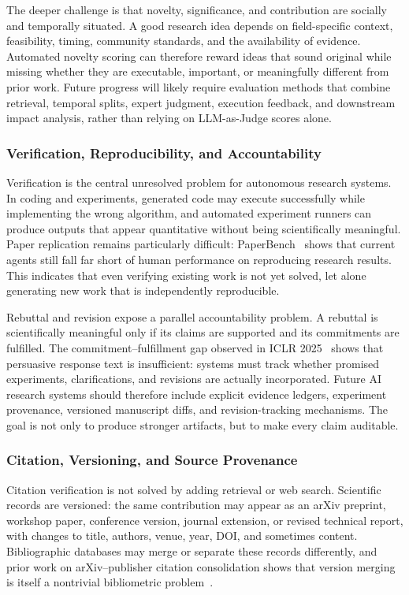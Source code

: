 The deeper challenge is that novelty, significance, and contribution are socially and temporally situated. A good research idea depends on field-specific context, feasibility, timing, community standards, and the availability of evidence. Automated novelty scoring can therefore reward ideas that sound original while missing whether they are executable, important, or meaningfully different from prior work. Future progress will likely require evaluation methods that combine retrieval, temporal splits, expert judgment, execution feedback, and downstream impact analysis, rather than relying on LLM-as-Judge scores alone.


\subsubsection{Verification, Reproducibility, and Accountability}

Verification is the central unresolved problem for autonomous research systems. In coding and experiments, generated code may execute successfully while implementing the wrong algorithm, and automated experiment runners can produce outputs that appear quantitative without being scientifically meaningful. Paper replication remains particularly difficult: PaperBench~\cite{paperbench2025} shows that current agents still fall far short of human performance on reproducing research results. This indicates that even verifying existing work is not yet solved, let alone generating new work that is independently reproducible.

Rebuttal and revision expose a parallel accountability problem. A rebuttal is scientifically meaningful only if its claims are supported and its commitments are fulfilled. The commitment--fulfillment gap observed in ICLR 2025~\cite{rebuttalcommitment2026} shows that persuasive response text is insufficient: systems must track whether promised experiments, clarifications, and revisions are actually incorporated. Future AI research systems should therefore include explicit evidence ledgers, experiment provenance, versioned manuscript diffs, and revision-tracking mechanisms. The goal is not only to produce stronger artifacts, but to make every claim auditable.


\subsubsection{Citation, Versioning, and Source Provenance}

Citation verification is not solved by adding retrieval or web search. Scientific records are versioned: the same contribution may appear as an arXiv preprint, workshop paper, conference version, journal extension, or revised technical report, with changes to title, authors, venue, year, DOI, and sometimes content. Bibliographic databases may merge or separate these records differently, and prior work on arXiv--publisher citation consolidation shows that version merging is itself a nontrivial bibliometric problem~\cite{gao2020arxivcitationmerging}.

